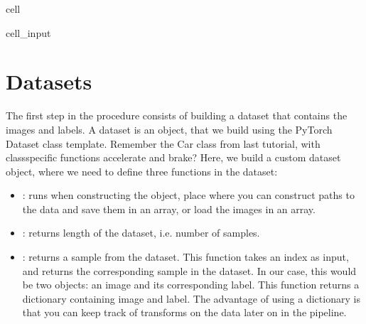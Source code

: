 \documentclass[letterpaper,10pt,english]{jupyterBook}
\begin{document}
\begin{sphinxuseclass}{cell}\begin{sphinxVerbatimInput}

\begin{sphinxuseclass}{cell_input}
\begin{sphinxVerbatim}[commandchars=\\\{\}]
 
   
\end{sphinxVerbatim}

\end{sphinxuseclass}\end{sphinxVerbatimInput}

\end{sphinxuseclass}

\section{Datasets}
\label{\detokenize{notebooks/Tutorial2_ConvolutionalNeuralNetworks/Tutorial2_ConvolutionalNeuralNetworks_student:datasets}}
\sphinxAtStartPar
The first step in the procedure consists of building a dataset that contains the images and labels. A dataset is an object, that we build using the PyTorch Dataset class template. Remember the  Car  class from last tutorial, with class\sphinxhyphen{}specific functions accelerate and brake? Here, we build a custom dataset object, where we need to define three functions in the dataset:
\begin{itemize}
\item {} 
\sphinxAtStartPar
{}: runs when constructing the object, place where you can construct paths to the data and save them in an array, or load the images in an array.

\item {} 
\sphinxAtStartPar
{}: returns length of the dataset, i.e. number of samples.

\item {} 
\sphinxAtStartPar
{}: returns a sample from the dataset. This function takes an index as input, and returns the corresponding sample in the dataset. In our case, this would be two objects: an image and its corresponding label. This function returns a dictionary containing image and label. The advantage of using a dictionary is that you can keep track of transforms on the data later on in the pipeline.

\end{itemize}
\end{document}
